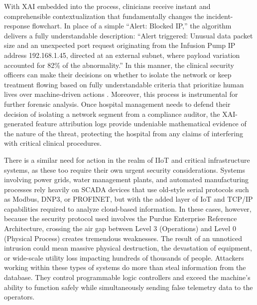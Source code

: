 \documentclass[12pt]{article}
\begin{document}
With XAI embedded into the process, clinicians receive instant and comprehensible contextualization that fundamentally changes the incident-response flowchart. In place of a simple “Alert: Blocked IP,” the algorithm delivers a fully understandable description: “Alert triggered: Unusual data packet size and an unexpected port request originating from the Infusion Pump IP address 192.168.1.45, directed at an external subnet, where payload variation accounted for 82\% of the abnormality.” In this manner, the clinical security officers can make their decisions on whether to isolate the network or keep treatment flowing based on fully understandable criteria that prioritize human lives over machine-driven actions \cite{judith2023efficient}. Moreover, this process is instrumental for further forensic analysis. Once hospital management needs to defend their decision of isolating a network segment from a compliance auditor, the XAI-generated feature attribution logs provide undeniable mathematical evidence of the nature of the threat, protecting the hospital from any claims of interfering with critical clinical procedures.

There is a similar need for action in the realm of IIoT and critical infrastructure systems, as these too require their own urgent security considerations. Systems involving power grids, water management plants, and automated manufacturing processes rely heavily on SCADA devices that use old-style serial protocols such as Modbus, DNP3, or PROFINET, but with the added layer of IoT and TCP/IP capabilities required to analyze cloud-based information. In these cases, however, because the security protocol used involves the Purdue Enterprise Reference Architecture, crossing the air gap between Level 3 (Operations) and Level 0 (Physical Process) creates tremendous weaknesses. The result of an unnoticed intrusion could mean massive physical destruction, the devastation of equipment, or wide-scale utility loss impacting hundreds of thousands of people. Attackers working within these types of systems do more than steal information from the database. They control programmable logic controllers and exceed the machine's ability to function safely while simultaneously sending false telemetry data to the operators.
\end{document}
